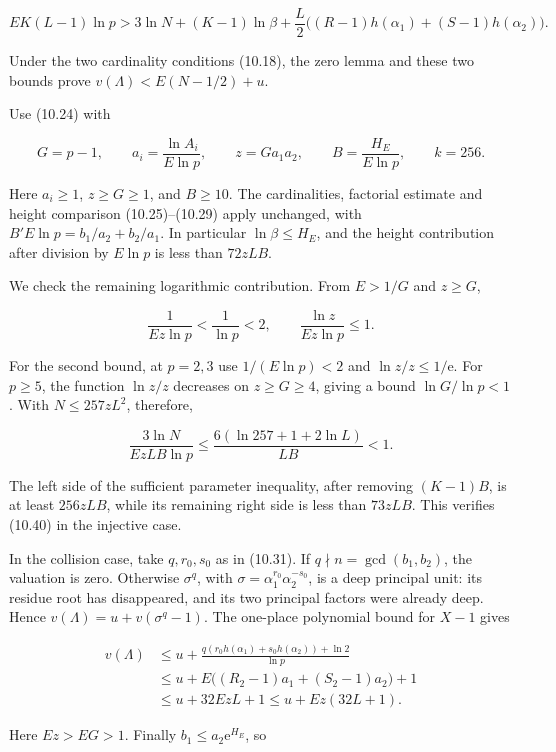 \documentclass[
  11pt,
  a4paper,
]{article}
\begin{document}
\[
EK(L-1)\ln p>
3\ln N+(K-1)\ln\beta
+\frac L2\bigl((R-1)h(\alpha_1)+(S-1)h(\alpha_2)\bigr).
\tag{10.40}
\]

Under the two cardinality conditions (10.18), the zero lemma and these
two bounds prove \(v(\Lambda)<E(N-1/2)+u\).

Use (10.24) with

\[
G=p-1,\qquad a_i=\frac{\ln A_i}{E\ln p},\qquad
z=Ga_1a_2,\qquad B=\frac{H_E}{E\ln p},\qquad k=256.
\tag{10.41}
\]

Here \(a_i\ge1\), \(z\ge G\ge1\), and \(B\ge10\). The cardinalities,
factorial estimate and height comparison (10.25)--(10.29) apply
unchanged, with \(B' E\ln p=b_1/a_2+b_2/a_1\). In particular
\(\ln\beta\le H_E\), and the height contribution after division by
\(E\ln p\) is less than \(72zLB\).

We check the remaining logarithmic contribution. From \(E>1/G\) and
\(z\ge G\),

\[
\frac1{Ez\ln p}<\frac1{\ln p}<2,
\qquad
\frac{\ln z}{Ez\ln p}\le1.
\]

For the second bound, at \(p=2,3\) use \(1/(E\ln p)<2\) and
\(\ln z/z\le1/\mathrm e\). For \(p\ge5\), the function \(\ln z/z\)
decreases on \(z\ge G\ge4\), giving a bound \(\ln G/\ln p<1\). With
\(N\le257zL^2\), therefore,

\[
\frac{3\ln N}{EzLB\ln p}
\le\frac{6(\ln257+1+2\ln L)}{LB}<1.
\]

The left side of the sufficient parameter inequality, after removing
\((K-1)B\), is at least \(256zLB\), while its remaining right side is
less than \(73zLB\). This verifies (10.40) in the injective case.

In the collision case, take \(q,r_0,s_0\) as in (10.31). If
\(q\nmid n=\gcd(b_1,b_2)\), the valuation is zero. Otherwise
\(\sigma^q\), with \(\sigma=\alpha_1^{r_0}\alpha_2^{-s_0}\), is a deep
principal unit: its residue root has disappeared, and its two principal
factors were already deep. Hence \(v(\Lambda)=u+v(\sigma^q-1)\). The
one-place polynomial bound for \(X-1\) gives

\[
\begin{aligned}
v(\Lambda)
&\le u+\frac{q(r_0h(\alpha_1)+s_0h(\alpha_2))+\ln2}{\ln p}\\
&\le u+E\bigl((R_2-1)a_1+(S_2-1)a_2\bigr)+1\\
&\le u+32EzL+1\le u+Ez(32L+1).
\end{aligned}
\tag{10.42}
\]

Here \(Ez>EG>1\). Finally \(b_1\le a_2\mathrm e^{H_E}\), so
\end{document}
